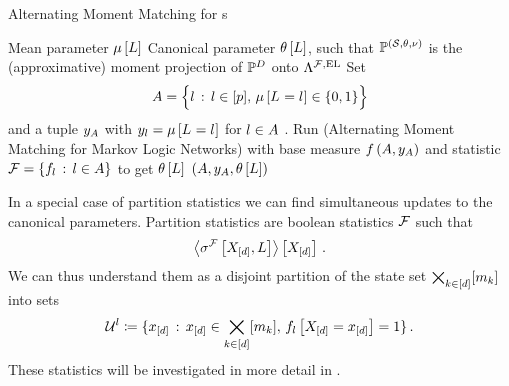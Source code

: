 \begin{algorithm}[hbt!]
    \caption{Alternating Moment Matching for \HybridLogicNetwork{}s}\label{alg:AMM_HLN}
    \begin{algorithmic}
        \Require Mean parameter $\mu\left[L\right]$
        \Ensure Canonical parameter $\theta\left[L\right]$, such that $\mathbb{P}^{(\mathcal{S},\theta,\nu)}$ is the (approximative) moment projection of $\mathbb{P}^{D}$ onto $\Lambda^{\mathcal{F},\mathrm{EL}}$
        \iosepline
        \State Set
        \begin{align*}
            A = \Big\{ l \,:\, l\in[p] ,\, \mu\left[L_{}=l_{}\right]\in\{0,1\} \Big\}
        \end{align*}
        and a tuple $y_{A}$ with $y_{l}=\mu\left[L_{}=l_{}\right]$ for $l\in A$ .
        \State Run  (Alternating Moment Matching for Markov Logic Networks) with base measure $f\left(A,y_{A}\right)$ and statistic $\mathcal{F}=\{f_{l}\,:\,l\in A\}$ to get $\theta\left[L\right]$
        \State \Return $(A,y_{A},\theta\left[L\right])$
    \end{algorithmic}
\end{algorithm}



In a special case of partition statistics we can find simultaneous updates to the canonical parameters.
Partition statistics are boolean statistics $\mathcal{F}$ such that
\begin{align*}
    \left\langle \sigma^{\mathcal{F}}\left[X_{[d]},L\right]\right\rangle \left[ X_{[d]} \right] \, .
\end{align*}
We can thus understand them as a disjoint partition of the state set $\bigtimes_{k\in[d]}[m_{k}]$ into sets
\begin{align*}
    \mathcal{U}^{l} \coloneqq \{x_{[d]}\,:\,x_{[d]}\in\bigtimes_{k\in[d]}[m_{k}],\,f_{l}\left[X_{[d]}=x_{[d]}\right]=1\} \, .
\end{align*}
These statistics will be investigated in more detail in .

